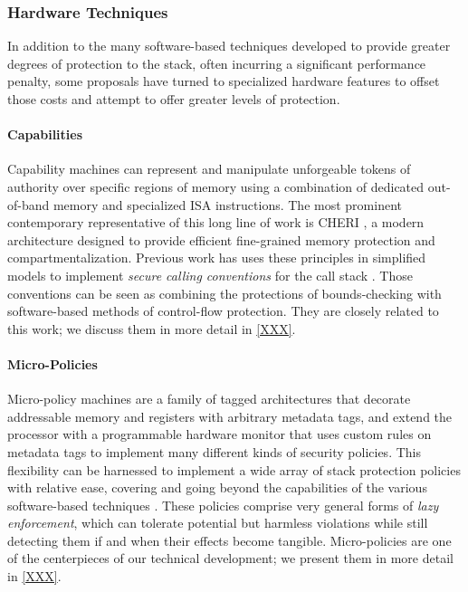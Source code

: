 \subsubsection{Hardware Techniques}

In addition to the many software-based techniques developed to provide greater
degrees of protection to the stack, often incurring a significant performance penalty,
some proposals have turned to specialized hardware features to offset those
costs and attempt to offer greater levels of protection.
%

\paragraph{Capabilities}
%

%
Capability machines can represent and manipulate
unforgeable tokens of authority over specific regions of
memory using a combination of dedicated out-of-band memory and
specialized ISA instructions.
%
The most prominent contemporary representative of this long line of work is
CHERI \cite{}, a modern architecture designed to provide efficient fine-grained
memory protection and compartmentalization.
%
Previous work has uses these principles in simplified models to implement
\emph{secure calling conventions} for the call
stack \cite{}. Those conventions can be seen as combining the
protections of bounds-checking with software-based methods of control-flow protection.
%
They are closely related  to this work; we discuss them in more
detail in \cref{XXX}.
%

\paragraph{Micro-Policies}
%
%
Micro-policy machines are a family of tagged architectures that decorate
addressable memory and registers with arbitrary metadata tags, and extend the
processor with a programmable hardware monitor that uses custom rules on
metadata tags to implement many different kinds of security policies.
%
This flexibility can be harnessed to implement a wide array of stack protection policies with relative ease, covering and going beyond the capabilities  of the various software-based techniques \cite{} .
%
These policies comprise very general forms of \emph{lazy enforcement}, which can tolerate
potential but harmless violations  while still detecting them if and when their effects
become tangible.
%
Micro-policies are one of the centerpieces of our technical development; we
present them in more detail in \cref{XXX}.

